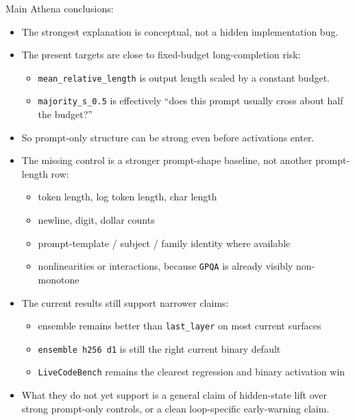 \documentclass[11pt]{article}
\begin{document}
Main Athena conclusions:
\begin{itemize}[leftmargin=1.5em]
\item The strongest explanation is conceptual, not a hidden implementation bug.
\item The present targets are close to fixed-budget long-completion risk:
  \begin{itemize}[leftmargin=1.5em]
  \item \texttt{mean\_relative\_length} is output length scaled by a constant budget.
  \item \texttt{majority\_s\_0.5} is effectively ``does this prompt usually cross about half the budget?''
  \end{itemize}
\item So prompt-only structure can be strong even before activations enter.
\item The missing control is a stronger prompt-shape baseline, not another prompt-length row:
  \begin{itemize}[leftmargin=1.5em]
  \item token length, log token length, char length
  \item newline, digit, dollar counts
  \item prompt-template / subject / family identity where available
  \item nonlinearities or interactions, because \texttt{GPQA} is already visibly non-monotone
  \end{itemize}
\item The current results still support narrower claims:
  \begin{itemize}[leftmargin=1.5em]
  \item ensemble remains better than \texttt{last\_layer} on most current surfaces
  \item \texttt{ensemble h256 d1} is still the right current binary default
  \item \texttt{LiveCodeBench} remains the clearest regression and binary activation win
  \end{itemize}
\item What they do not yet support is a general claim of hidden-state lift over strong prompt-only controls, or a clean loop-specific early-warning claim.
\end{itemize}
\end{document}
